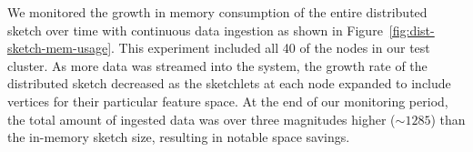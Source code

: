 We monitored the growth in memory consumption of the entire distributed sketch over time with continuous data ingestion as shown in Figure~\ref{fig:dist-sketch-mem-usage}. This experiment included all 40 of the nodes in our test cluster.  As more data was streamed into the system, the growth rate of the distributed sketch decreased as the sketchlets at each node expanded to include vertices for their particular feature space.  At the end of our monitoring period, the total amount of ingested data was over three magnitudes higher ($\sim 1285$) than the in-memory sketch size, resulting in notable space savings.
